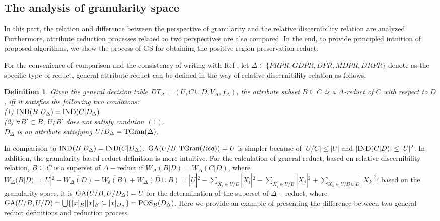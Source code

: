 \documentclass[review]{elsarticle}
\newtheorem*{OtherDef}{Definition}
\begin{document}
	\subsection{The analysis of granularity space}\label{ag}
		\par In this part, the relation and difference between the perspective of granularity and the relative discernibility relation are analyzed. Furthermore, attribute reduction processes related to two perspectives are also compared. In the end, to provide principled intuition of proposed algorithms, we show the process of GS for obtaining the positive region preservation reduct.
		\par For the convenience of comparison and the consistency of writing with Ref \cite{ge2017quick}, let $\Delta \in \{PRPR, GDPR, DPR, MDPR, DRPR\}$ denote as the specific type of reduct, general attribute reduct can be defined in the way of relative discernibility relation as follows.
		\begin{OtherDef} \label{rdrgrd}
			Given the general decision table $DT_\Delta=(U,C \cup D,V_\Delta,f_\Delta)$, the attribute subset $B\subseteq C$ is a $\Delta$-reduct of $C$ with respect to $D$, iff it satisfies the following two conditions:
			\\{\rm(1)} ${\rm IND}(B|D_\Delta)={\rm IND}(C|D_\Delta)$
			\\{\rm(2)} $\forall B' \subset B$, $U/B'$ does not satisfy condition $(1)$.\\
			$D_\Delta$ is an attribute satisfying $U/D_\Delta={\rm TGran}(\Delta)$.
		\end{OtherDef}
		 In comparison to ${\rm IND}(B|D_\Delta)={\rm IND}(C|D_\Delta)$, ${\rm GA}(U/B,{\rm TGran}(Red))=U$ is simpler because of $|U/C| \leq |U|$ and $|{\rm IND}(C|D)| \leq |U|^2$. In addition, the granularity based reduct definition is more intuitive. For the calculation of general reduct, based on relative discernibility relation, $B\subseteq C$ is a superset of $\Delta-$reduct if $W_\Delta(B|D)=W_\Delta(C|D)$, where $W_\Delta(B|D)=|U|^2-\overline{W_\Delta(D)}-\overline{W_\delta(B)}+\overline{W_\Delta(D \cup B)}=|U|^2-\sum_{X_i\in U/D}|X_i|^2-\sum_{X_j\in U/B}|X_j|^2+\sum_{X_k \in U/B\cup D}|X_k|^2$; based on the granularity space, it is ${\rm GA}(U/B,U/D_\Delta)=U$ for the determination of the superset of $\Delta-$reduct, where ${\rm GA}(U/B,U/D)=\bigcup \{[x]_B|[x]_B \subseteq [x]_{D_\Delta}\}={\rm POS}_B(D_\Delta)$. Here we provide an example of presenting the difference between two general reduct definitions and reduction process.\\
\end{document}

